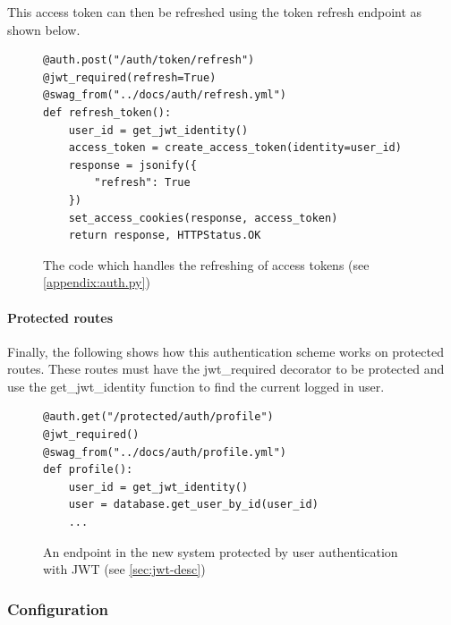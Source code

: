 \documentclass[12pt, letterpaper]{article}
\begin{document}
\begin{flushleft}
This access token can then be refreshed using the token refresh endpoint as shown below.
\end{flushleft}

\begin{flushleft}
\begin{figure}[H]
\begin{verbatim}
@auth.post("/auth/token/refresh")
@jwt_required(refresh=True)
@swag_from("../docs/auth/refresh.yml")
def refresh_token():
    user_id = get_jwt_identity()
    access_token = create_access_token(identity=user_id)
    response = jsonify({
        "refresh": True
    })
    set_access_cookies(response, access_token)
    return response, HTTPStatus.OK
\end{verbatim}
\caption{The code which handles the refreshing of access tokens (see \ref{appendix:auth.py})}
\end{figure}
\end{flushleft}

\paragraph{Protected routes}

\begin{flushleft}
Finally, the following shows how this authentication scheme works on protected routes. These routes must have the jwt\_required decorator to be protected and use the get\_jwt\_identity function to find the current logged in user.
\end{flushleft}

\begin{flushleft}
\begin{figure}[H]
\begin{verbatim}
@auth.get("/protected/auth/profile")
@jwt_required()
@swag_from("../docs/auth/profile.yml")
def profile():
    user_id = get_jwt_identity()
    user = database.get_user_by_id(user_id)
    ...
\end{verbatim}
\caption{An endpoint in the new system protected by user authentication with JWT (see \ref{sec:jwt-desc})}
\end{figure}
\end{flushleft}

\subsubsection{Configuration}\label{sec:impl-config}
\end{document}
